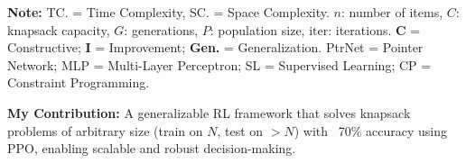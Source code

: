 \begin{frame}
    \vspace{-1em}
    \vfill

    \tiny
    \textbf{Note:} TC. = Time Complexity, SC. = Space Complexity.  
    $n$: number of items, $C$: knapsack capacity, $G$: generations, $P$: population size, $\text{iter}$: iterations.  
    \textbf{C} = Constructive; \textbf{I} = Improvement; \textbf{Gen.} = Generalization.  
    PtrNet = Pointer Network; MLP = Multi-Layer Perceptron; SL = Supervised Learning; CP = Constraint Programming.

    \medskip

    \textbf{My Contribution:} A generalizable RL framework that solves knapsack problems of arbitrary size (train on $N$, test on $>N$) with ~70\% accuracy using PPO, enabling scalable and robust decision-making.
\end{frame}